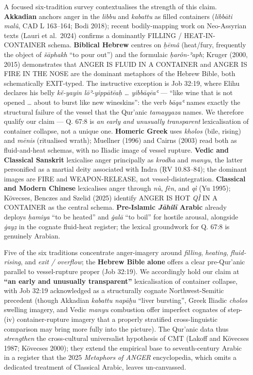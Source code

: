 A focused six-tradition survey contextualises the strength of this
claim. \textbf{Akkadian} anchors anger in the \emph{libbu} and
\emph{kabattu} as filled containers (\emph{libbāti malû}, CAD L
163--164; Bodi 2018); recent bodily-mapping work on Neo-Assyrian texts
(Lauri et al.~2024) confirms a dominantly FILLING / HEAT-IN-CONTAINER
schema. \textbf{Biblical Hebrew} centres on \emph{ḥēmâ} (heat/fury,
frequently the object of \emph{šāphakh} ``to pour out'') and the
formulaic \emph{ḥarôn-ʾaph}; Kruger (2000, 2015) demonstrates that ANGER
IS FLUID IN A CONTAINER and ANGER IS FIRE IN THE NOSE are the dominant
metaphors of the Hebrew Bible, both schematically EXIT-typed. The
instructive exception is Job 32:19, where Elihu declares his belly
\emph{kĕ-yayin lōʾ-yippātēaḥ \ldots{} yibbāqēaʿ} --- ``like wine that is
not opened \ldots{} about to burst like new wineskins'': the verb
\emph{bāqaʿ} names exactly the structural failure of the vessel that the
Qur'anic \emph{tamayyaza} names. We therefore qualify our claim --- Q.
67:8 is \emph{an early and unusually transparent} lexicalisation of
container collapse, not a unique one. \textbf{Homeric Greek} uses
\emph{kholos} (bile, rising) and \emph{mēnis} (ritualised wrath);
Muellner (1996) and Cairns (2003) read both as fluid-and-heat schemas,
with no Iliadic image of vessel rupture. \textbf{Vedic and Classical
Sanskrit} lexicalise anger principally as \emph{krodha} and
\emph{manyu}, the latter personified as a martial deity associated with
Indra (ṚV 10.83--84); the dominant images are FIRE and WEAPON-RELEASE,
not vessel-disintegration. \textbf{Classical and Modern Chinese}
lexicalises anger through \emph{nù}, \emph{fèn}, and \emph{qì} (Yu
1995); Kövecses, Benczes and Szelid (2025) identify ANGER IS HOT
\emph{QÌ} IN A CONTAINER as the central schema. \textbf{Pre-Islamic
\emph{Jāhilī} Arabic} already deploys \emph{ḥamiya} ``to be heated'' and
\emph{ġalā} ``to boil'' for hostile arousal, alongside \emph{ġayẓ} in
the cognate fluid-heat register; the lexical groundwork for Q. 67:8 is
genuinely Arabian.

Five of the six traditions concentrate anger-imagery around
\emph{filling}, \emph{heating}, \emph{fluid-rising}, and \emph{exit /
overflow}; the \textbf{Hebrew Bible alone} offers a clear pre-Qur'anic
parallel to vessel-rupture proper (Job 32:19). We accordingly hold our
claim at \textbf{``an early and unusually transparent''} lexicalisation
of container collapse, with Job 32:19 acknowledged as a structurally
cognate Northwest-Semitic precedent (though Akkadian \emph{kabattu
napāḫu} ``liver bursting'', Greek Iliadic \emph{cholos} swelling
imagery, and Vedic \emph{manyu} combustion offer imperfect cognates of
step-(iv) container-rupture imagery that a properly stratified
cross-linguistic comparison may bring more fully into the picture). The
Qur'anic data thus \emph{strengthen} the cross-cultural universalist
hypothesis of CMT (Lakoff and Kövecses 1987; Kövecses 2000); they extend
the empirical base to seventh-century Arabic in a register that the 2025
\emph{Metaphors of ANGER} encyclopedia, which omits a dedicated
treatment of Classical Arabic, leaves un-canvassed.

